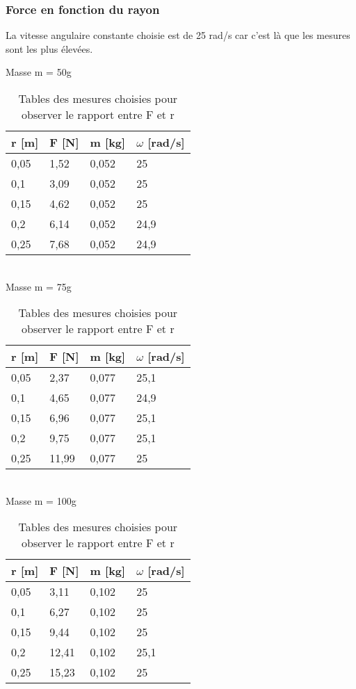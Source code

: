 \newpage

\subsubsection{Force en fonction du rayon}

La vitesse angulaire constante choisie est de 25 rad/s car c’est là que les mesures sont les plus élevées.

\begin{table}[ht]
    \centering
    \caption[Tables mesures rayon force]{Tables des mesures choisies pour observer le rapport entre F et r}

    Masse m = 50g\\[1px]
    \begin{tabular}{|l|l|l|l|}
    \hline
	r [m]	&F [N]	&m [kg]	&$\omega$ [rad/s]\\
    \hline
	0,05	&1,52	&0,052	&25              \\
	0,1	&3,09	&0,052	&25              \\
	0,15	&4,62	&0,052	&25              \\
	0,2	&6,14	&0,052	&24,9            \\
	0,25	&7,68	&0,052	&24,9            \\
    \hline
    \end{tabular}\\[5px]

    Masse m = 75g\\[1px]
    \begin{tabular}{|l|l|l|l|}
    \hline
	r [m]	&F [N]	&m [kg]	&$\omega$ [rad/s]\\
    \hline
	0,05	&2,37	&0,077	&25,1            \\
	0,1	&4,65	&0,077	&24,9            \\
	0,15	&6,96	&0,077	&25,1            \\
	0,2	&9,75	&0,077	&25,1            \\
	0,25	&11,99	&0,077	&25              \\
    \hline
    \end{tabular}\\[5px]

    Masse m = 100g\\[1px]
    \begin{tabular}{|l|l|l|l|}
    \hline
	r [m]	&F [N]	&m [kg]	&$\omega$ [rad/s]\\
    \hline
	0,05	&3,11	&0,102	&25              \\
	0,1	&6,27	&0,102	&25              \\
	0,15	&9,44	&0,102	&25              \\
	0,2	&12,41	&0,102	&25,1            \\
	0,25	&15,23	&0,102	&25              \\
    \hline
    \end{tabular}
\end{table}

